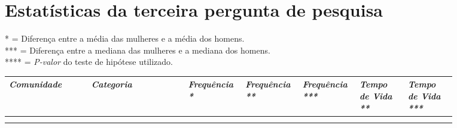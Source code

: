 \chapter{Estatísticas da terceira pergunta de pesquisa}
\label{app:q3}

\small

* = Diferença entre a média das mulheres e a média dos homens. \\
*** = Diferença entre a mediana das mulheres e a mediana dos homens. \\
**** = \textit{P-valor} do teste de hipótese utilizado. 
\begin{longtabu}{@{}
	p{0.17\linewidth}
	p{0.2\linewidth}
	P{0.1\linewidth}
	P{0.1\linewidth}
	P{0.1\linewidth}
	P{0.1\linewidth}
	p{0.1\linewidth}@{}}

\toprule
\textit{Comunidade}  & \textit{Categoria}  & \textit{Frequência *} & \textit{Frequência **} & \textit{Frequência ***} & \textit{Tempo de Vida **} & \textit{Tempo de Vida ***} \\ \midrule
\endhead

\\ \hline
\endfoot


\end{longtabu}
